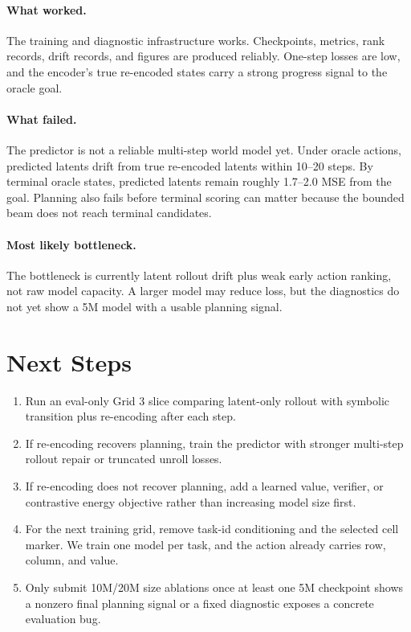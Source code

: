 \documentclass[11pt]{article}
\begin{document}
\paragraph{What worked.}
The training and diagnostic infrastructure works. Checkpoints, metrics,
rank records, drift records, and figures are produced reliably. One-step losses
are low, and the encoder's true re-encoded states carry a strong progress signal
to the oracle goal.

\paragraph{What failed.}
The predictor is not a reliable multi-step world model yet. Under oracle
actions, predicted latents drift from true re-encoded latents within 10--20
steps. By terminal oracle states, predicted latents remain roughly 1.7--2.0 MSE
from the goal. Planning also fails before terminal scoring can matter because
the bounded beam does not reach terminal candidates.

\paragraph{Most likely bottleneck.}
The bottleneck is currently latent rollout drift plus weak early action ranking,
not raw model capacity. A larger model may reduce loss, but the diagnostics do
not yet show a 5M model with a usable planning signal.

\section{Next Steps}

\begin{enumerate}
  \item Run an eval-only Grid 3 slice comparing latent-only rollout with
        symbolic transition plus re-encoding after each step.
  \item If re-encoding recovers planning, train the predictor with stronger
        multi-step rollout repair or truncated unroll losses.
  \item If re-encoding does not recover planning, add a learned value, verifier,
        or contrastive energy objective rather than increasing model size first.
  \item For the next training grid, remove task-id conditioning and the selected
        cell marker. We train one model per task, and the action already carries
        row, column, and value.
  \item Only submit 10M/20M size ablations once at least one 5M checkpoint shows
        a nonzero final planning signal or a fixed diagnostic exposes a concrete
        evaluation bug.
\end{enumerate}
\end{document}
